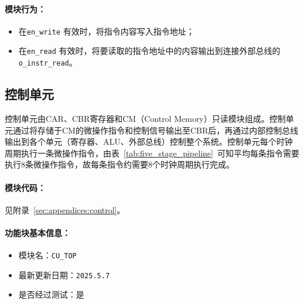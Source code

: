 \documentclass[lang=cn,a4paper,newtx]{elegantpaper}
\begin{document}
\paragraph{模块行为：}
\begin{itemize}
  \item 在\texttt{en\_write} 有效时，将指令内容写入指令地址；
  \item 在\texttt{en\_read} 有效时，将要读取的指令地址中的内容输出到连接外部总线的\texttt{o\_instr\_read}。
\end{itemize}


\subsection{控制单元}
控制单元由CAR、CBR寄存器和CM（Control Memory）只读模块组成。控制单元通过将存储于CM的微操作指令和控制信号输出至CBR后，再通过内部控制总线输出到各个单元（寄存器、ALU、外部总线）控制整个系统。控制单元每个时钟周期执行一条微操作指令，由表~\ref{tab:five_stage_pipeline}~可知平均每条指令需要执行8条微操作指令，故每条指令约需要8个时钟周期执行完成。

\paragraph{模块代码：}
见附录~\ref{sec:appendices:control}。

\paragraph{功能块基本信息：}
\begin{itemize}
  \item 模块名：\texttt{CU\_TOP}
  \item 最新更新日期：\texttt{2025.5.7}
  \item 是否经过测试：是
\end{itemize}
\end{document}
